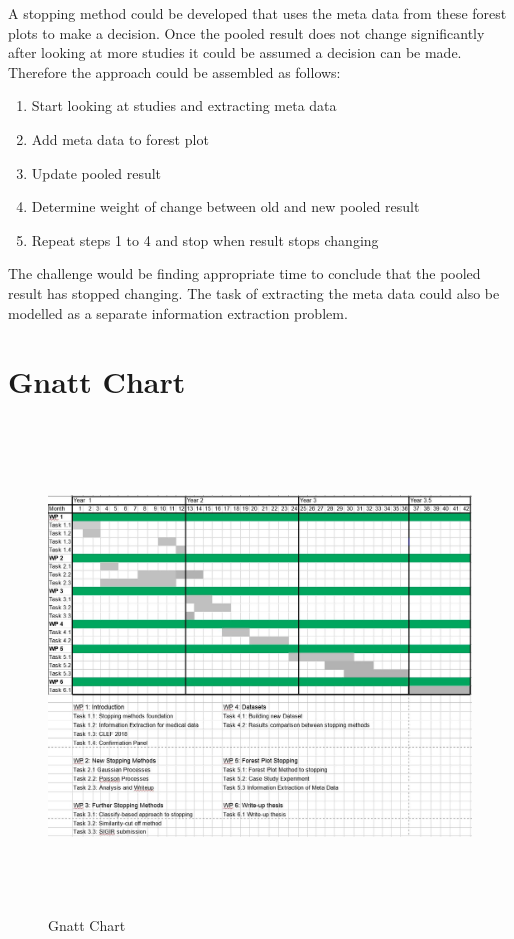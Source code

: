A stopping method could be developed that uses the meta data from these forest plots to make a decision. Once the pooled result does not change significantly after looking at more studies it could be assumed a decision can be made. Therefore the approach could be assembled as follows:

\begin{enumerate}

\item{Start looking at studies and extracting meta data}
\item{Add meta data to forest plot}
\item{Update pooled result}
\item{Determine weight of change between old and new pooled result}
\item{Repeat steps 1 to 4 and stop when result stops changing}

\end{enumerate}

The challenge would be finding appropriate time to conclude that the pooled result has stopped changing. The task of extracting the meta data could also be modelled as a separate information extraction problem. 





\section{Gnatt Chart} \label{gnatt}


\begin{figure}[H]
\center
\includegraphics[height=13cm]{figures/gnatt_chart2.jpg}
\caption{Gnatt Chart}
\end{figure}


